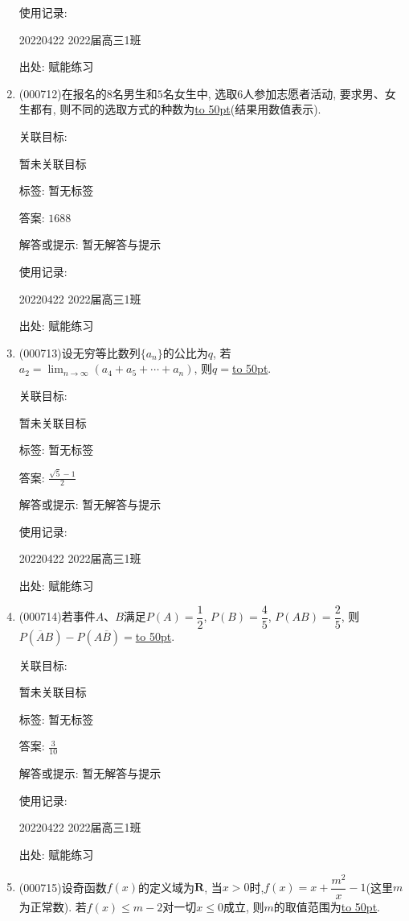 \documentclass[10pt,a4paper]{article}
\newcommand{\blank}[1]{\underline{\hbox to #1pt{}}}
\begin{document}
\begin{enumerate}[1.]
使用记录:

20220422	2022届高三1班	


出处: 赋能练习
\item { (000712)}在报名的$8$名男生和$5$名女生中, 选取$6$人参加志愿者活动, 要求男、女生都有, 则不同的选取方式的种数为\blank{50}(结果用数值表示).


关联目标:

暂未关联目标



标签: 暂无标签

答案: $1688$

解答或提示: 暂无解答与提示

使用记录:

20220422	2022届高三1班	


出处: 赋能练习
\item { (000713)}设无穷等比数列$\{a_n\}$的公比为$q$, 若$a_2=\displaystyle\lim_{n\to\infty}(a_4+a_5+\cdots+a_n)$, 则$q=$\blank{50}.


关联目标:

暂未关联目标



标签: 暂无标签

答案: $\frac{\sqrt 5-1}2$

解答或提示: 暂无解答与提示

使用记录:

20220422	2022届高三1班	


出处: 赋能练习
\item { (000714)}若事件$A$、$B$满足$P(A)=\dfrac12$, $P(B)=\dfrac45$, $P(AB)=\dfrac25$, 则$P(\overline A B)-P(A\overline B)=$\blank{50}.


关联目标:

暂未关联目标



标签: 暂无标签

答案: $\frac 3{10}$

解答或提示: 暂无解答与提示

使用记录:

20220422	2022届高三1班	


出处: 赋能练习
\item { (000715)}设奇函数$f(x)$的定义域为$\mathbf{R}$, 当$x>0$时,$f(x)=x+\dfrac{m^2}x-1$(这里$m$为正常数). 若$f(x)\le m-2$对一切$x\le 0$成立, 则$m$的取值范围为\blank{50}.



\end{enumerate}
\end{document}
